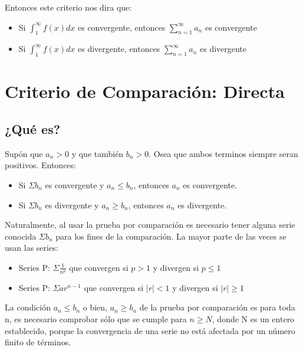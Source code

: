 \documentclass[12pt]{article}							    %
\begin{document}
Entonces este criterio nos dira que:
\begin{itemize}
   \item Si $\int _1^{\infty}f(x) dx$ es convergente, entonces $\sum_{n=1}^{\infty} a_n$ es convergente
   \item Si $\int _1^{\infty}f(x) dx$ es divergente, entonces $\sum_{n=1}^{\infty} a_n$ es divergente
\end{itemize}





\clearpage
\section{Criterio de Comparación: Directa}


\subsection{¿Qué es?}
Supón que $a _n > 0$ y que también $b_n > 0$. Osea que ambos terminos siempre seran positivos.
Entonces:

\begin{itemize}
    \item Si $\Sigma b_n$ es convergente y $a_n \leq b_n$, entonces $a_n$ es convergente. 
    \item Si $\Sigma b_n$ es divergente y $a_n \geq b_n$, entonces $a_n$ es divergente. 
\end{itemize}

Naturalmente, al usar la prueba por comparación es necesario tener alguna serie conocida $\Sigma b_n$ para los fines de la comparación. La mayor parte de las veces se usan las series:

\begin{itemize}
    \item Series P: $\Sigma \frac{1}{n^p}$ que convergen si $p>1$ y divergen si $p\leq 1$
    \item Series P: $\Sigma ar^{n-1}$ que convergen si $|r|<1$ y divergen si $|r|\geq 1$
\end{itemize}

La condición $a_n \leq b_n$ o bien, $a_n \geq b_n$ de la prueba por comparación es para toda n, es necesario comprobar sólo que se cumple para $n \geq N$, donde N es un entero establecido, porque la convergencia de una serie no está afectada por un número finito de términos.
\end{document}
